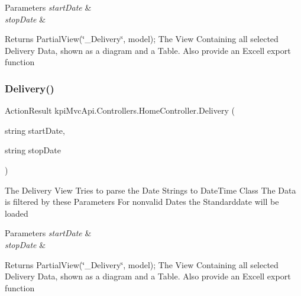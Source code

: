 \begin{DoxyParams}{Parameters}
{\em start\+Date} & \\
\hline
{\em stop\+Date} & \\
\hline
\end{DoxyParams}
\begin{DoxyReturn}{Returns}
{\ttfamily Partial\+View(\char`\"{}\+\_\+\+Delivery\char`\"{}, model);} The View Containing all selected Delivery Data, shown as a diagram and a Table. Also provide an Excell export function 
\end{DoxyReturn}
\mbox{\label{classkpi_mvc_api_1_1_controllers_1_1_home_controller_a0fe5ac7be69616c8f56e8938e042cc27}} 
\subsubsection{\texorpdfstring{Delivery()}{Delivery()}\hspace{0.1cm}{\footnotesize\ttfamily [2/2]}}
{\footnotesize\ttfamily Action\+Result kpi\+Mvc\+Api.\+Controllers.\+Home\+Controller.\+Delivery (\begin{DoxyParamCaption}\item[{string}]{start\+Date,  }\item[{string}]{stop\+Date }\end{DoxyParamCaption})\hspace{0.3cm}{\ttfamily [inline]}}



The Delivery View Tries to parse the Date Strings to Date\+Time Class The Data is filtered by these Parameters For nonvalid Dates the Standarddate will be loaded 


\begin{DoxyParams}{Parameters}
{\em start\+Date} & \\
\hline
{\em stop\+Date} & \\
\hline
\end{DoxyParams}
\begin{DoxyReturn}{Returns}
{\ttfamily Partial\+View(\char`\"{}\+\_\+\+Delivery\char`\"{}, model);} The View Containing all selected Delivery Data, shown as a diagram and a Table. Also provide an Excell export function 
\end{DoxyReturn}
\mbox{\label{classkpi_mvc_api_1_1_controllers_1_1_home_controller_a8fe51f06ec9db44e1766f89691af44f6}} 
